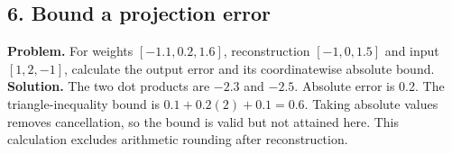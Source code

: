 \subsection*{6. Bound a projection error}
\textbf{Problem.} For weights $[-1.1,0.2,1.6]$, reconstruction
$[-1,0,1.5]$ and input $[1,2,-1]$, calculate the output error
and its coordinatewise absolute bound.
\textbf{Solution.} The two dot products are $-2.3$ and $-2.5$.
Absolute error is 0.2. The triangle-inequality bound is
$0.1+0.2(2)+0.1=0.6$. Taking absolute values removes cancellation,
so the bound is valid but not attained here. This calculation
excludes arithmetic rounding after reconstruction.
